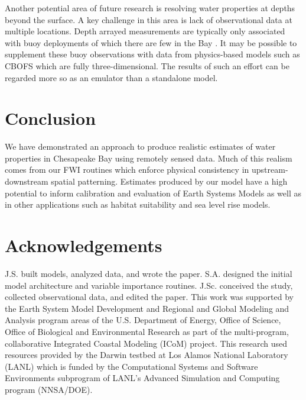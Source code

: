 \documentclass{article}
\begin{document}
Another potential area of future research is resolving water properties at depths beyond the surface. A key challenge in this area is lack of observational data at multiple locations. Depth arrayed measurements are typically only associated with buoy deployments of which there are few in the Bay \cite{vogelAssessingSatelliteSea2016}. It may be possible to supplement these buoy observations with data from physics-based models such as CBOFS which are fully three-dimensional. The results of such an effort can be regarded more so as an emulator than a standalone model.

\section{Conclusion}

We have demonstrated an approach to produce realistic estimates of water properties in Chesapeake Bay using remotely sensed data. Much of this realism comes from our FWI routines which enforce physical consistency in upstream-downstream spatial patterning. Estimates produced by our model have a high potential to inform calibration and evaluation of Earth Systems Models as well as in other applications such as habitat suitability and sea level rise models.

\FloatBarrier

\section{Acknowledgements}

J.S. built models, analyzed data, and wrote the paper. S.A. designed the initial model architecture and variable importance routines. J.Sc. conceived the study, collected observational data, and edited the paper. This work was supported by the Earth System Model Development and Regional and Global Modeling and Analysis program areas of the U.S. Department of Energy, Office of Science, Office of Biological and Environmental Research as part of the multi-program, collaborative Integrated Coastal Modeling (ICoM) project. This research used resources provided by the Darwin testbed at Los Alamos National Laboratory (LANL) which is funded by the Computational Systems and Software Environments subprogram of LANL's Advanced Simulation and Computing program (NNSA/DOE).



\end{document}
